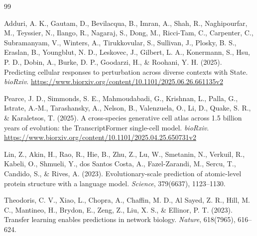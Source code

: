 \documentclass{article}
\begin{document}
\FloatBarrier

\begin{thebibliography}{99}

Adduri, A. K., Gautam, D., Bevilacqua, B., Imran, A., Shah, R., Naghipourfar, M., Teyssier, N., Ilango, R., Nagaraj, S., Dong, M., Ricci-Tam, C., Carpenter, C., Subramanyam, V., Winters, A., Tirukkovular, S., Sullivan, J., Plosky, B. S., Eraslan, B., Youngblut, N. D., Leskovec, J., Gilbert, L. A., Konermann, S., Hsu, P. D., Dobin, A., Burke, D. P., Goodarzi, H., \& Roohani, Y. H. (2025). Predicting cellular responses to perturbation across diverse contexts with State. \textit{bioRxiv}. \url{https://www.biorxiv.org/content/10.1101/2025.06.26.661135v2}

Pearce, J. D., Simmonds, S. E., Mahmoudabadi, G., Krishnan, L., Palla, G., Istrate, A.-M., Tarashansky, A., Nelson, B., Valenzuela, O., Li, D., Quake, S. R., \& Karaletsos, T. (2025). A cross-species generative cell atlas across 1.5 billion years of evolution: the TranscriptFormer single-cell model. \textit{bioRxiv}. \url{https://www.biorxiv.org/content/10.1101/2025.04.25.650731v2}

Lin, Z., Akin, H., Rao, R., Hie, B., Zhu, Z., Lu, W., Smetanin, N., Verkuil, R., Kabeli, O., Shmueli, Y., dos Santos Costa, A., Fazel-Zarandi, M., Sercu, T., Candido, S., \& Rives, A. (2023). Evolutionary-scale prediction of atomic-level protein structure with a language model. \textit{Science}, 379(6637), 1123--1130.

Theodoris, C. V., Xiao, L., Chopra, A., Chaffin, M. D., Al Sayed, Z. R., Hill, M. C., Mantineo, H., Brydon, E., Zeng, Z., Liu, X. S., \& Ellinor, P. T. (2023). Transfer learning enables predictions in network biology. \textit{Nature}, 618(7965), 616--624.

\end{thebibliography}
\end{document}
